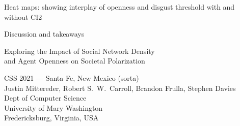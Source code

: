\documentclass[12pt]{beamer}
\begin{document}
\begin{frame}[c]{Heat maps: showing interplay of openness and disgust threshold
with and without CI2} %

\end{frame}


%
%
%
%

\begin{frame}[c]{Discussion and takeaways}  %

\end{frame}

\begin{frame}[c]{}

\begin{center}
\Large
Exploring the Impact of Social Network Density\\and Agent Openness on Societal Polarization

\footnotesize
\vspace{.3in}
CSS 2021 --- Santa Fe, New Mexico (sorta)\\
\vspace{.1in}
Justin Mittereder, Robert S.~W.~Carroll, Brandon Frulla, Stephen Davies\\
\smallskip
\scriptsize
Dept of Computer Science\\
University of Mary Washington\\
Fredericksburg, Virginia, USA\\
\end{center}

\end{frame}
\end{document}
